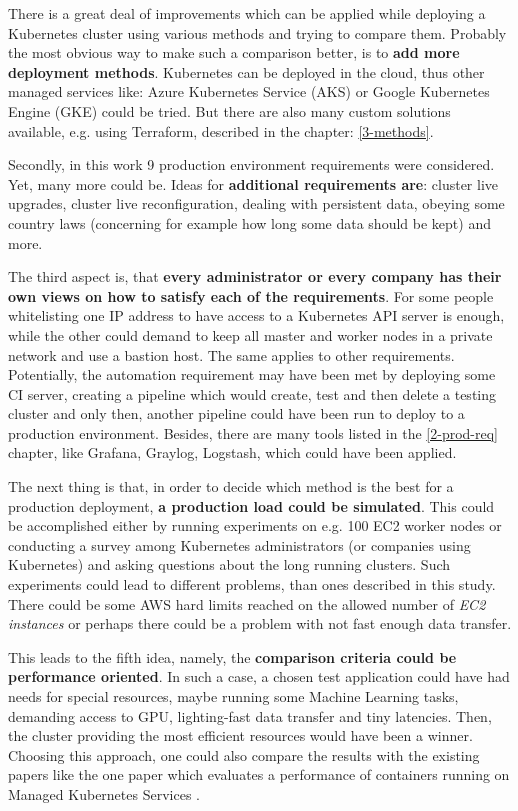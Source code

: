 There is a great deal of improvements which can be applied while deploying a Kubernetes cluster using various methods and trying to compare them. Probably the most obvious way to make such a comparison better, is to \textbf{add more deployment methods}. Kubernetes can be deployed in the cloud, thus other managed services like: Azure Kubernetes Service (AKS) or Google Kubernetes Engine (GKE) could be tried. But there are also many custom solutions available, e.g. using Terraform, described in the chapter: \ref{3-methods}.

Secondly, in this work 9 production environment requirements were considered. Yet, many more could be. Ideas for \textbf{additional requirements are}: cluster live upgrades, cluster live reconfiguration, dealing with persistent data, obeying some country laws (concerning for example how long some data should be kept) and more.

The third aspect is, that \textbf{every administrator or every company has their own views on how to satisfy each of the requirements}. For some people whitelisting one IP address to have access to a Kubernetes API server is enough, while the other could demand to keep all master and worker nodes in a private network and use a bastion host. The same applies to other requirements. Potentially, the automation requirement may have been met by deploying some CI server, creating a pipeline which would create, test and then delete a testing cluster and only then, another pipeline could have been run to deploy to a production environment. Besides, there are many tools listed in the \ref{2-prod-req} chapter, like Grafana, Graylog, Logstash, which could have been applied.

The next thing is that, in order to decide which method is the best for a production deployment, \textbf{a production load could be simulated}. This could be accomplished either by running experiments on e.g. 100 EC2 worker nodes or conducting a survey among Kubernetes administrators (or companies using Kubernetes) and asking questions about the long running clusters. Such experiments could lead to different problems, than ones described in this study. There could be some AWS hard limits reached on the allowed number of \textit{EC2 instances} or perhaps there could be a problem with not fast enough data transfer.

This leads to the fifth idea, namely, the \textbf{comparison criteria could be performance oriented}. In such a case, a chosen test application could have had needs for special resources, maybe running some Machine Learning tasks, demanding access to GPU, lighting-fast data transfer and tiny latencies. Then, the cluster providing the most efficient resources would have been a winner. Choosing this approach, one could also compare the results with the existing papers like the one paper which evaluates a performance of containers running on Managed Kubernetes Services \cite{article-managed}.

